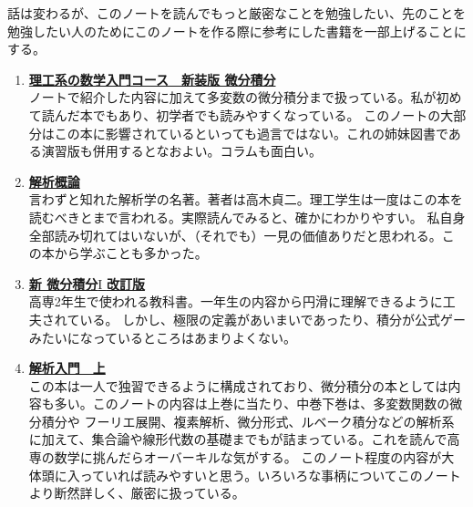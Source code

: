 \documentclass[a4j,dvipdfmx]{jsarticle}
\begin{document}
        話は変わるが、このノートを読んでもっと厳密なことを勉強したい、先のことを勉強したい人のためにこのノートを作る際に参考にした書籍を一部上げることにする。
        \begin{enumerate}\setcounter{enumi}{0}\renewcommand{\labelenumi}{(\arabic{enumi})}
            \item \href{https://www.iwanami.co.jp/book/b482316.html}{\textbf{理工系の数学入門コース　新装版 微分積分}}\\ノートで紹介した内容に加えて多変数の微分積分まで扱っている。私が初めて読んだ本でもあり、初学者でも読みやすくなっている。
            このノートの大部分はこの本に影響されているといっても過言ではない。これの姉妹図書である演習版も併用するとなおよい。コラムも面白い。
            \item \href{https://www.iwanami.co.jp/book/b265489.html}{\textbf{解析概論}}\\言わずと知れた解析学の名著。著者は高木貞二。理工学生は一度はこの本を読むべきとまで言われる。実際読んでみると、確かにわかりやすい。
            私自身全部読み切れてはいないが、（それでも）一見の価値ありだと思われる。この本から学ぶことも多かった。
            \item \href{https://www.dainippon-tosho.co.jp/college_math/differential1.html}{\textbf{新 微分積分}I \textbf{改訂版}}\\高専2年生で使われる教科書。一年生の内容から円滑に理解できるように工夫されている。
            しかし、極限の定義があいまいであったり、積分が公式ゲーみたいになっているところはあまりよくない。
            \item \href{https://www.iwanami.co.jp/book/b378350.html}{\textbf{解析入門　上}}\\この本は一人で独習できるように構成されており、微分積分の本としては内容も多い。このノートの内容は上巻に当たり、中巻下巻は、多変数関数の微分積分や
            フーリエ展開、複素解析、微分形式、ルベーク積分などの解析系に加えて、集合論や線形代数の基礎までもが詰まっている。これを読んで高専の数学に挑んだらオーバーキルな気がする。
            このノート程度の内容が大体頭に入っていれば読みやすいと思う。いろいろな事柄についてこのノートより断然詳しく、厳密に扱っている。
        \end{enumerate}
    \clearpage
\end{document}

